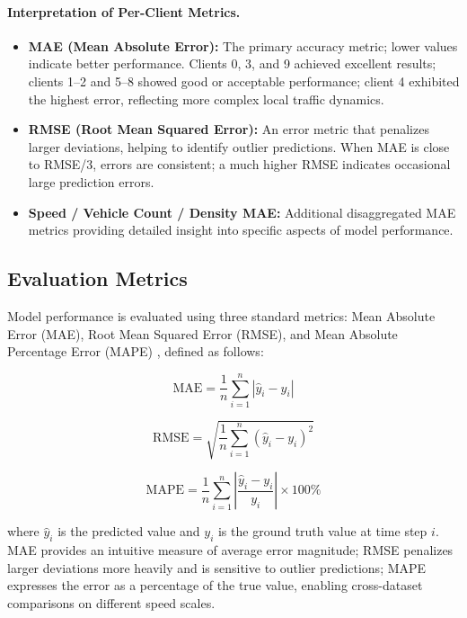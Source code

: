 \documentclass[pdflatex,sn-mathphys-num]{sn-jnl}
\theoremstyle{thmstyleone}
\theoremstyle{thmstyletwo}
\theoremstyle{thmstylethree}
\begin{document}
\paragraph{Interpretation of Per-Client Metrics.}
\begin{itemize}
    \item \textbf{MAE (Mean Absolute Error):} The primary accuracy metric; lower values indicate better performance. Clients 0, 3, and 9 achieved excellent results; clients 1--2 and 5--8 showed good or acceptable performance; client 4 exhibited the highest error, reflecting more complex local traffic dynamics.
    \item \textbf{RMSE (Root Mean Squared Error):} An error metric that penalizes larger deviations, helping to identify outlier predictions. When MAE is close to RMSE/3, errors are consistent; a much higher RMSE indicates occasional large prediction errors.
    \item \textbf{Speed / Vehicle Count / Density MAE:} Additional disaggregated MAE metrics providing detailed insight into specific aspects of model performance.
\end{itemize}

\subsection{Evaluation Metrics}

Model performance is evaluated using three standard metrics: Mean Absolute Error (MAE), Root Mean Squared Error (RMSE), and Mean Absolute Percentage Error (MAPE) \cite{li2018dcrnn}, defined as follows:

\begin{equation}
  \mathrm{MAE} = \frac{1}{n}\sum_{i=1}^{n}\left|\hat{y}_i - y_i\right|
\end{equation}

\begin{equation}
  \mathrm{RMSE} = \sqrt{\frac{1}{n}\sum_{i=1}^{n}\left(\hat{y}_i - y_i\right)^2}
\end{equation}

\begin{equation}
  \mathrm{MAPE} = \frac{1}{n}\sum_{i=1}^{n}\left|\frac{\hat{y}_i - y_i}{y_i}\right| \times 100\%
\end{equation}

where $\hat{y}_i$ is the predicted value and $y_i$ is the ground truth value at time step $i$. MAE provides an intuitive measure of average error magnitude; RMSE penalizes larger deviations more heavily and is sensitive to outlier predictions; MAPE expresses the error as a percentage of the true value, enabling cross-dataset comparisons on different speed scales.
\end{document}
